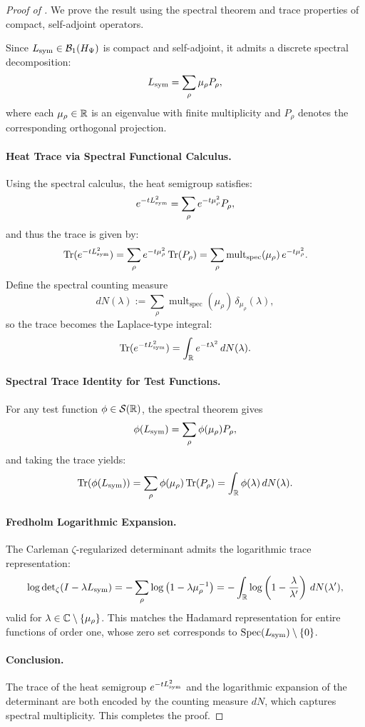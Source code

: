 \begin{proof}[Proof of ]
We prove the result using the spectral theorem and trace properties of compact, self-adjoint operators.

Since \( L_{\mathrm{sym}} \in \mathcal{B}_1(H_{\Psi}) \) is compact and self-adjoint, it admits a discrete spectral decomposition:
\[
L_{\mathrm{sym}} = \sum_{\rho} \mu_\rho P_\rho,
\]
where each \( \mu_\rho \in \mathbb{R} \) is an eigenvalue with finite multiplicity and \( P_\rho \) denotes the corresponding orthogonal projection.

\paragraph{Heat Trace via Spectral Functional Calculus.}
Using the spectral calculus, the heat semigroup satisfies:
\[
e^{-t L_{\mathrm{sym}}^2} = \sum_{\rho} e^{-t\mu_\rho^2} P_\rho,
\]
and thus the trace is given by:
\[
\operatorname{Tr}(e^{-t L_{\mathrm{sym}}^2}) = \sum_{\rho} e^{-t\mu_\rho^2} \operatorname{Tr}(P_\rho) = \sum_{\rho} \operatorname{mult}_{\mathrm{spec}}(\mu_\rho) \, e^{-t\mu_\rho^2}.
\]
Define the spectral counting measure
\[
dN(\lambda) := \sum_{\rho} \operatorname{mult}_{\mathrm{spec}}(\mu_\rho) \, \delta_{\mu_\rho}(\lambda),
\]
so the trace becomes the Laplace-type integral:
\[
\operatorname{Tr}(e^{-t L_{\mathrm{sym}}^2}) = \int_{\mathbb{R}} e^{-t\lambda^2} \, dN(\lambda).
\]

\paragraph{Spectral Trace Identity for Test Functions.}
For any test function \( \phi \in \mathcal{S}(\mathbb{R}) \), the spectral theorem gives
\[
\phi(L_{\mathrm{sym}}) = \sum_{\rho} \phi(\mu_\rho) P_\rho,
\]
and taking the trace yields:
\[
\operatorname{Tr}(\phi(L_{\mathrm{sym}})) = \sum_{\rho} \phi(\mu_\rho) \operatorname{Tr}(P_\rho) = \int_{\mathbb{R}} \phi(\lambda) \, dN(\lambda).
\]

\paragraph{Fredholm Logarithmic Expansion.}
The Carleman \(\zeta\)-regularized determinant admits the logarithmic trace representation:
\[
\log \det\nolimits_\zeta(I - \lambda L_{\mathrm{sym}}) = - \sum_{\rho} \log\left(1 - \lambda \mu_\rho^{-1} \right) = - \int_{\mathbb{R}} \log\left(1 - \frac{\lambda}{\lambda'} \right) \, dN(\lambda'),
\]
valid for \( \lambda \in \mathbb{C} \setminus \{ \mu_\rho \} \). This matches the Hadamard representation for entire functions of order one, whose zero set corresponds to \( \operatorname{Spec}(L_{\mathrm{sym}}) \setminus \{0\} \).

\paragraph{Conclusion.}
The trace of the heat semigroup \( e^{-t L_{\mathrm{sym}}^2} \) and the logarithmic expansion of the determinant are both encoded by the counting measure \( dN \), which captures spectral multiplicity. This completes the proof.
\end{proof}
